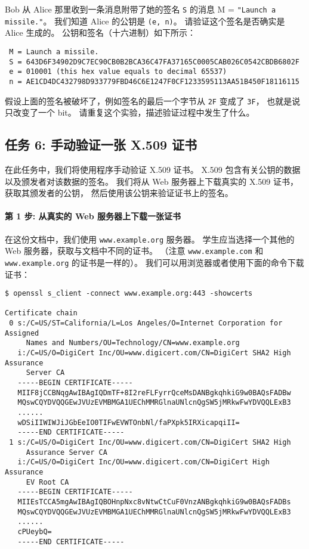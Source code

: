 Bob 从 Alice 那里收到一条消息附带了她的签名 \texttt{S} 的消息
M = \texttt{"Launch a missile."}。
我们知道 Alice 的公钥是 \texttt{(e, n)}。
请验证这个签名是否确实是 Alice 生成的。
公钥和签名（十六进制）如下所示：

\begin{lstlisting}
 M = Launch a missile.
 S = 643D6F34902D9C7EC90CB0B2BCA36C47FA37165C0005CAB026C0542CBDB6802F
 e = 010001 (this hex value equals to decimal 65537)
 n = AE1CD4DC432798D933779FBD46C6E1247F0CF1233595113AA51B450F18116115
\end{lstlisting}


假设上面的签名被破坏了，例如签名的最后一个字节从 \texttt{2F} 变成了 \texttt{3F}，
也就是说只改变了一个 bit。
请重复这个实验，描述验证过程中发生了什么。


\subsection{任务 6: 手动验证一张 X.509 证书}

在此任务中，我们将使用程序手动验证 X.509 证书。
X.509 包含有关公钥的数据以及颁发者对该数据的签名。
我们将从 Web 服务器上下载真实的 X.509 证书，获取其颁发者的公钥，
然后使用该公钥来验证证书上的签名。

\paragraph{第 1 步: 从真实的 Web 服务器上下载一张证书}
在这份文档中，我们使用 \texttt{www.example.org} 服务器。
学生应当选择一个其他的 Web 服务器，获取与文档中不同的证书。
（注意 \texttt{www.example.com} 和 \texttt{www.example.org} 的证书是一样的）。
我们可以用浏览器或者使用下面的命令下载证书：

\begin{lstlisting}
$ openssl s_client -connect www.example.org:443 -showcerts

Certificate chain
 0 s:/C=US/ST=California/L=Los Angeles/O=Internet Corporation for Assigned
     Names and Numbers/OU=Technology/CN=www.example.org
   i:/C=US/O=DigiCert Inc/OU=www.digicert.com/CN=DigiCert SHA2 High Assurance
     Server CA
   -----BEGIN CERTIFICATE-----
   MIIF8jCCBNqgAwIBAgIQDmTF+8I2reFLFyrrQceMsDANBgkqhkiG9w0BAQsFADBw
   MQswCQYDVQQGEwJVUzEVMBMGA1UEChMMRGlnaUNlcnQgSW5jMRkwFwYDVQQLExB3
   ......
   wDSiIIWIWJiJGbEeIO0TIFwEVWTOnbNl/faPXpk5IRXicapqiII=
   -----END CERTIFICATE-----
 1 s:/C=US/O=DigiCert Inc/OU=www.digicert.com/CN=DigiCert SHA2 High
     Assurance Server CA
   i:/C=US/O=DigiCert Inc/OU=www.digicert.com/CN=DigiCert High Assurance
     EV Root CA
   -----BEGIN CERTIFICATE-----
   MIIEsTCCA5mgAwIBAgIQBOHnpNxc8vNtwCtCuF0VnzANBgkqhkiG9w0BAQsFADBs
   MQswCQYDVQQGEwJVUzEVMBMGA1UEChMMRGlnaUNlcnQgSW5jMRkwFwYDVQQLExB3
   ......
   cPUeybQ=
   -----END CERTIFICATE-----
\end{lstlisting}

